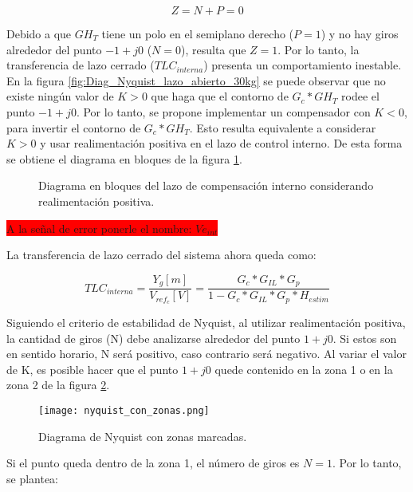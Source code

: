 \begin{equation}\label{eq_condicion_Nyquist}
	Z=N+P=0
\end{equation}


Debido a que $GH_T$ tiene un polo en el semiplano derecho ($P=1$) y no hay giros alrededor del punto $-1+j0$ ($N=0$), resulta que $Z=1$. Por lo tanto, la transferencia de lazo cerrado ($TLC_{interna}$) presenta un comportamiento inestable. En la figura \ref{fig:Diag_Nyquist_lazo_abierto_30kg} se puede observar que no existe ningún valor de $K>0$ que haga que el contorno de $G_c*GH_T$ rodee el punto $-1+j0$. Por lo tanto, se propone implementar un compensador con $K<0$, para invertir el contorno de $G_c*GH_T$. Esto resulta equivalente a considerar $K>0$ y usar realimentación positiva en el lazo de control interno. De esta forma se obtiene el diagrama en bloques de la figura \ref{fig:diag-interno_realimentacion_positiva}.


\begin{figure}[H]
	\centering
	
	\caption{Diagrama en bloques del lazo de compensación interno considerando realimentación positiva.}	\label{fig:diag-interno_realimentacion_positiva}
\end{figure}

\colorbox{red}{A la señal de error ponerle el nombre: $Ve_{int}$}

La transferencia de lazo cerrado del sistema ahora queda como:

\begin{equation}
	TLC_{interna}=\frac{Y_g[m]}{V_{ref_c}[V]}=\frac{G_c*G_{IL}*G_p}{1-G_c*G_{IL}*G_p*H_{estim}}
\end{equation}

Siguiendo el criterio de estabilidad de Nyquist, al utilizar realimentación positiva, la cantidad de giros (N) debe analizarse alrededor del punto $1+j0$. Si estos son en sentido horario, N será positivo, caso contrario será negativo. Al variar el valor de K, es posible hacer que el punto $1+j0$ quede contenido en la zona 1 o en la zona 2 de la figura \ref{fig:nyquist-con-zonas}. 

\begin{figure}[H]
	\centering
	\texttt{[image: nyquist\_con\_zonas.png]}
	\caption{Diagrama de Nyquist con zonas marcadas.}	
	\label{fig:nyquist-con-zonas}
\end{figure}

Si el punto queda dentro de la zona 1, el número de giros es $N=1$. Por lo tanto, se plantea:

